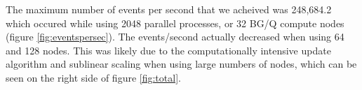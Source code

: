 The maximum number of events per second that we acheived was 248,684.2 which
occured while using 2048 parallel processes, or 32 BG/Q compute nodes (figure
\ref{fig:eventspersec}). The events/second actually decreased when using 64 and
128 nodes. This was likely due to the computationally intensive update algorithm
and sublinear scaling when using large numbers of nodes, which can be seen on the
right side of figure \ref{fig:total}.
